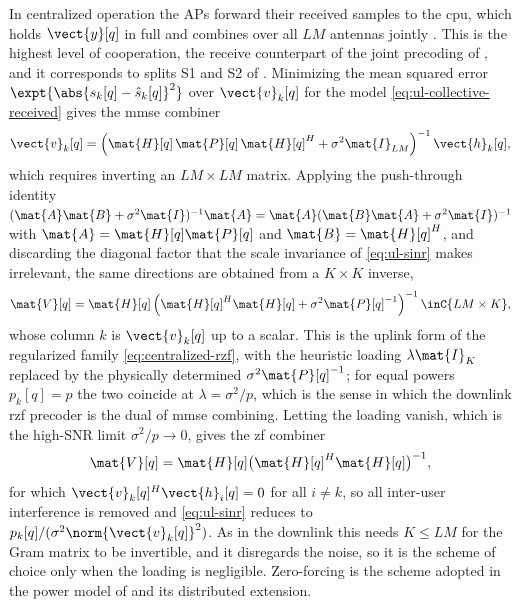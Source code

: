 In centralized operation the APs forward their received samples to the \gls{cpu},
which holds $\vect{y}[q]$ in full and combines over all $LM$ antennas jointly
\cite{demir2021foundations}. This is the highest level of cooperation, the
receive counterpart of the joint precoding of , and it
corresponds to splits S1 and S2 of . Minimizing the mean squared
error $\expt{\abs{s_{k}[q]-\hat{s}_{k}[q]}^{2}}$ over $\vect{v}_{k}[q]$ for the
model \eqref{eq:ul-collective-received} gives the \gls{mmse} combiner
\begin{equation}
\label{eq:ul-mmse-combiner}
\vect{v}_{k}[q] = \left(\mat{H}[q]\,\mat{P}[q]\,\mat{H}[q]^{H}
+ \sigma^{2}\mat{I}_{LM}\right)^{-1}\vect{h}_{k}[q],
\end{equation}
which requires inverting an $LM\times LM$ matrix. Applying the push-through
identity $(\mat{A}\mat{B}+\sigma^{2}\mat{I})^{-1}\mat{A}
=\mat{A}(\mat{B}\mat{A}+\sigma^{2}\mat{I})^{-1}$ with $\mat{A}=\mat{H}[q]\mat{P}[q]$
and $\mat{B}=\mat{H}[q]^{H}$, and discarding the diagonal factor that the scale
invariance of \eqref{eq:ul-sinr} makes irrelevant, the same directions are
obtained from a $K\times K$ inverse,
\begin{equation}
\label{eq:ul-centralized-rzf}
\mat{V}[q] = \mat{H}[q]\left(\mat{H}[q]^{H}\mat{H}[q]
+ \sigma^{2}\mat{P}[q]^{-1}\right)^{-1} \inC{LM\times K},
\end{equation}
whose column $k$ is $\vect{v}_{k}[q]$ up to a scalar. This is the uplink form of
the regularized family \eqref{eq:centralized-rzf}, with the heuristic loading
$\lambda\mat{I}_{K}$ replaced by the physically determined
$\sigma^{2}\mat{P}[q]^{-1}$; for equal powers $p_{k}[q]=p$ the two coincide at
$\lambda=\sigma^{2}/p$, which is the sense in which the downlink \gls{rzf}
precoder is the dual of \gls{mmse} combining. Letting the loading vanish, which
is the high-SNR limit $\sigma^{2}/p\to 0$, gives the \gls{zf} combiner
\begin{equation}
\label{eq:ul-zf-combiner}
\mat{V}[q] = \mat{H}[q]\big(\mat{H}[q]^{H}\mat{H}[q]\big)^{-1},
\end{equation}
for which $\vect{v}_{k}[q]^{H}\vect{h}_{i}[q]=0$ for all $i\neq k$, so all
inter-user interference is removed and \eqref{eq:ul-sinr} reduces to
$p_{k}[q]/(\sigma^{2}\norm{\vect{v}_{k}[q]}^{2})$. As in the downlink this needs
$K\leq LM$ for the Gram matrix to be invertible, and it disregards the noise, so
it is the scheme of choice only when the loading is negligible. Zero-forcing is
the scheme adopted in the power model of  and its distributed
extension.

